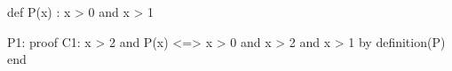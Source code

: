 def P(x) : x > 0 and x > 1

P1: proof
C1:   x > 2 and P(x) <=> x > 0  and x > 2 and x > 1 by definition(P)
end